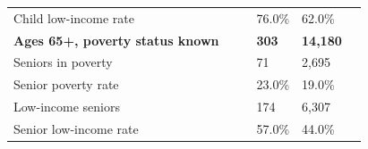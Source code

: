 \documentclass[9pt]{report}
\begin{document}
\begin{tabular}{p{.10in}p{.10in}p{.10in}p{3.7in}>{\hfill}p{.85in}>{\hfill}p{.85in}>{\hfill}p{.85in}>{\hfill}p{.85in}p{0.1in}}
\multicolumn{4}{l}{\parbox{3.6in}{\strut\raggedright{{Child low-income rate}}\strut}} &  &  & 76.0\% & 62.0\% & \multicolumn{1}{l}{}  \\ 
\multicolumn{4}{l}{\parbox{3.5in}{\strut\raggedright{\textbf{Ages 65+, poverty status known}\strut}}} & \textbf{} & \textbf{} & \textbf{303} & \textbf{14,180} & \textbf{} \\ 
\multicolumn{4}{l}{\parbox{3.6in}{\strut\raggedright{{Seniors in poverty}}\strut}} &  &  & 71 & 2,695 & \multicolumn{1}{l}{}  \\ 
\multicolumn{4}{l}{\parbox{3.6in}{\strut\raggedright{{Senior poverty rate}}\strut}} &  &  & 23.0\% & 19.0\% & \multicolumn{1}{l}{}  \\ 
\multicolumn{4}{l}{\parbox{3.6in}{\strut\raggedright{{Low-income seniors}}\strut}} &  &  & 174 & 6,307 & \multicolumn{1}{l}{}  \\ 
\multicolumn{4}{l}{\parbox{3.6in}{\strut\raggedright{{Senior low-income rate}}\strut}} &  &  & 57.0\% & 44.0\% & \multicolumn{1}{l}{}  \\ 

\end{tabular}
\setlength{\tabcolsep}{6pt} %
\end{document}
